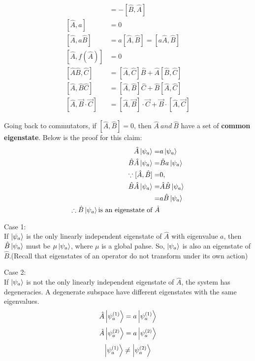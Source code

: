 \documentclass{article}
\begin{document}
\begin{flushleft}
\begin{align*}
    [\hat{A},\hat{B}]&=-[\hat{B},\hat{A}]\\
    [\hat{A},a]&=0\\
    [\hat{A},a\hat{B}]&=a[\hat{A},\hat{B}]=[a\hat{A},\hat{B}]\\
    [\hat{A},f(\hat{A})]&=0\\
    [\hat{A}\hat{B},\hat{C}]&=[\hat{A},\hat{C}]\hat{B}+\hat{A}[\hat{B},\hat{C}]\\
    [\hat{A},\hat{B}\hat{C}]&=[\hat{A},\hat{B}]\hat{C}+\hat{B}[\hat{A},\hat{C}]\\
    [\hat{A},\Vec{B}\cdot\Vec{C}]&=[\hat{A},\vec{B}]\cdot\Vec{C}+\vec{B}\cdot[\hat{A},\vec{C}]
\end{align*}


Going back to commutators, if $[\hat{A},\hat{B}]=0$,  then $\hat{A}\ and\ \hat{B}$ have a set of \textbf{common eigenstate}. Below is the proof for this claim:\\

\begin{align*}
    \hat{A}\ket{\psi_a}=&a\ket{\psi_a}\\
    \hat{B}\hat{A}\ket{\psi_a}=&\hat{B}a\ket{\psi_a}\\
    \because [\hat{A},\hat{B}]=&0,\\
    \hat{B}\hat{A}\ket{\psi_a}=&\hat{A}\hat{B}\ket{\psi_a}\\
    =&a\hat{B}\ket{\psi_a}\\
    \therefore \hat{B}\ket{\psi_a} \text{is an eigenstate of}\ \hat{A}
\end{align*}

Case 1:\\
If $\ket{\psi_a}$ is the only linearly independent eigenstate of $\hat{A}$ with eigenvalue $a$, then $\hat{B}\ket{\psi_a}$ must be $\mu\ket{\psi_a}$, where $\mu$ is a global pahse. So, $\ket{\psi_a}$ is also an eigenstate of $\hat{B}$.(Recall that eigenstates of an operator do not transform under its own action)\\
\pagebreak

Case 2:\\
If $\ket{\psi_a}$ is not the only linearly independent eigenstate of $\hat{A}$, the system has degeneracies. A degenerate subspace have different eigenstates with the same eigenvalues.\\

$$\hat{A}\ket{\psi_a^{(1)}}=a\ket{\psi_a^{(1)}}$$
$$\hat{A}\ket{\psi_a^{(2)}}=a\ket{\psi_a^{(2)}}$$
$$\ket{\psi_a^{(1)}}\neq\ket{\psi_a^{(2)}}$$


\end{flushleft}
\end{document}
